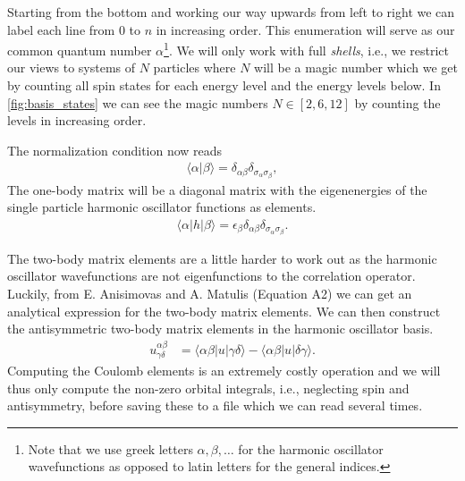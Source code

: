 \documentclass[
    a4paper, aps, twocolumn, floatfix, superscriptaddress,
    nofootinbib]{revtex4-1}
\newcommand{\1}{\mathds{1}}
\newcommand{\bra}[1]{\langle #1\lvert}
\newcommand{\ket}[1]{\rvert #1\rangle}
\newcommand{\braket}[2]{\langle #1 \vert #2 \rangle}
\begin{document}
            Starting from the bottom and working our way upwards from left to
            right we can label each line from $0$ to $n$ in increasing
            order. This enumeration will serve as our common quantum number
            $\alpha$\footnote{Note that we use greek letters $\alpha, \beta,
            \dots$ for the harmonic oscillator wavefunctions as opposed to latin
            letters for the general indices.}. We will only work with full
            \emph{shells}, i.e., we restrict our views to systems of $N$
            particles where $N$ will be a magic number which we get by counting
            all spin states for each energy level and the energy levels below.
            In \autoref{fig:basis_states} we can see the magic numbers $N \in [2,
            6, 12]$ by counting the levels in increasing order.

            The normalization condition now reads
            \begin{align}
                \braket{\alpha}{\beta}
                = \delta_{\alpha\beta}\delta_{\sigma_\alpha\sigma_\beta},
            \end{align}
            The one-body matrix will be a diagonal matrix with the eigenenergies
            of the single particle harmonic oscillator functions as elements.
            \begin{align}
                \bra{\alpha}h\ket{\beta}
                = \epsilon_{\beta}
                \delta_{\alpha\beta}\delta_{\sigma_\alpha\sigma_\beta}.
            \end{align}

            The two-body matrix elements are a little harder to work out as the
            harmonic oscillator wavefunctions are not eigenfunctions to the
            correlation operator. Luckily, from E. Anisimovas and A.  Matulis
            (Equation A2)\cite{anisimovas1998energy} we can get an analytical
            expression for the two-body matrix elements. We can then construct
            the antisymmetric two-body matrix elements in the harmonic
            oscillator basis.
            \begin{align}
                u^{\alpha\beta}_{\gamma\delta}
                &= \bra{\alpha\beta}u\ket{\gamma\delta}
                - \bra{\alpha\beta}u\ket{\delta\gamma}.
            \end{align}
            Computing the Coulomb elements is an extremely costly operation and
            we will thus only compute the non-zero orbital integrals, i.e., neglecting
            spin and antisymmetry, before saving these to a file which we can
            read several times.
\end{document}
